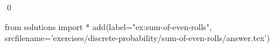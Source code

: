 
\begin{ex} 
  \label{ex:sum-of-even-rolls}
  
  \qed
\end{ex} 
\begin{python0}
from solutions import *
add(label="ex:sum-of-even-rolls",
    srcfilename='exercises/discrete-probability/sum-of-even-rolls/answer.tex') 
\end{python0}
